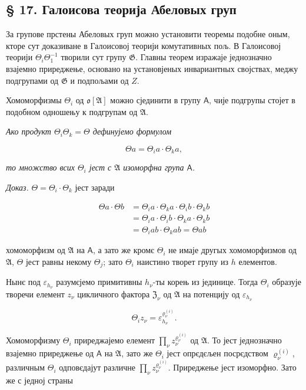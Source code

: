 \documentclass[11pt]{article}
\begin{document}
\subsection*{§ 17. Галоисова теорија Абеловых груп}\label{die-galoissche-theorie-abelscher-gruppen}

За групове прстены Абеловых груп можно установити теоремы подобне оным, кторе сут доказиване в Галоисовој теорији комутативных пољ. В Галоисовој теорији \(\Theta_i\Theta_1^{-1}\) творили сут групу \(\mathfrak{G}\). Главны теорем изражаје једнозначно взајемно приреджење, основано на установјеных инвариантных својствах, меджу подгрупами од \(\mathfrak{G}\) и подпољами од \(Z\).

Хомоморфизмы \(\Theta_i\) од \(\mathfrak{o}[\mathfrak{A}]\) можно сјединити в групу \(\mathsf A\), чије подгрупы стојет в подобном одношењу к подгрупам од \(\mathfrak{A}\).

\emph{Ако продукт \(\Theta_i \Theta_k = \Theta\) дефинујемо формулом}

\[\Theta a = \Theta_i a \cdot \Theta_k a,\]

\emph{то множство всих \(\Theta_i\) јест с \(\mathfrak A\) изоморфна група \(\mathsf A\).}

\emph{Доказ.} \(\Theta = \Theta_i \cdot \Theta_k\) јест заради

\[\begin{aligned}
\Theta a \cdot \Theta b &= \Theta_i a \cdot \Theta_k a \cdot \Theta_i b \cdot \Theta_k b \\
&= \Theta_i a \cdot \Theta_i b \cdot \Theta_k a \cdot \Theta_k b \\
&= \Theta_i a b \cdot \Theta_k a b = \Theta a b
\end{aligned}\]

хомоморфизм од \(\mathfrak A\) на \(\mathsf A\), а зато же кромє \(\Theta_i\) не имаје другых хомоморфизмов од \(\mathfrak A\), \(\Theta\) јест равны некому \(\Theta_j\); зато \(\Theta_i\) наистино творет групу из \(h\) елементов.

Нынє под \(\varepsilon_{h_\nu}\) разумєјемо примитивны \(h_\nu\)-ты корењ из јединице. Тогда \(\Theta_i\) образује творечи елемент \(z_\nu\) цикличного фактора \(\mathfrak Z_\nu\) од \(\mathfrak A\) на потенцију од \(\varepsilon_{h_\nu}\)

\[
\Theta_i z_\nu=\varepsilon_{h_\nu}^{\varrho_\nu^{(i)}}.
\]

Хомоморфизму \(\Theta_i\) приреджајемо елемент \(\prod_\nu z_\nu^{\varrho_\nu^{(i)}}\) од \(\mathfrak A\). То јест једнозначно взајемно приреджење од \(\mathsf A\) на \(\mathfrak A\), зато же \(\Theta_i\) јест опрєдєљен посрєдством \(\varrho_\nu^{(i)}\), различным \(\Theta_i\) одповєдајут различне \(\prod_\nu z_\nu^{\varrho_\nu^{(i)}}\). Приреджење јест изоморфно. Зато же с једној страны
\end{document}
